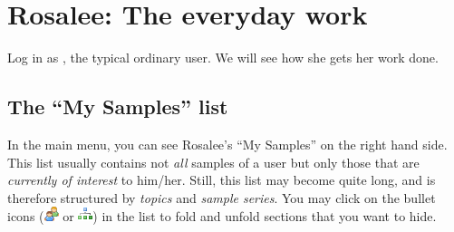 \documentclass[a4paper,11pt,english]{sphinxmanual}
\begin{document}
\section{Rosalee: The everyday work}
\label{demo:rosalee-the-everyday-work}
{\hfill{}}

Log in as , the typical ordinary user.  We will see how she gets
her work done.


\subsection{The “My Samples” list}
\label{demo:the-my-samples-list}\label{demo:index-2}
In the main menu, you can see Rosalee's “My Samples” on the right hand side.
This list usually contains not \emph{all} samples of a user but only those that are
\emph{currently of interest} to him/her.  Still, this list may become quite long,
and is therefore structured by \emph{topics} and \emph{sample series}.  You may click on
the bullet icons (\includegraphics{group.png} or \includegraphics{chart_organisation.png}) in the list to fold and
unfold sections that you want to hide.

\end{document}
